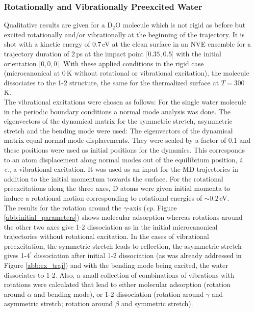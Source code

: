 \documentclass[11pt,DIV=13,BCOR=5mm,a4paper,headinclude]{scrbook}
\begin{document}
\subsubsection{Rotationally and Vibrationally Preexcited Water}\label{preex}
Qualitative results are given for a D$_2$O molecule which is not rigid as before but excited rotationally and/or vibrationally at the beginning of the trajectory.
It is shot with a kinetic energy of $0.7\,$eV at the clean surface in an NVE ensemble for a trajectory duration of $2\,$ps at the impact point [$0.35,0.5$] with the initial orientation [$0,0,0$].
With these applied conditions in the rigid case (microcanonical at $0\,$K without rotational or vibrational excitation), the molecule dissociates to the 1-2 structure, the same for the thermalized surface at $T=300\,$K.
\\
The vibrational excitations were chosen as follows: For the single water molecule in the periodic boundary conditions a normal mode analysis	 was done.
The eigenvectors of the dynamical matrix for the symmetric stretch, asymmetric stretch and the bending mode were used: The eigenvectors of the dynamical matrix equal normal mode displacements.
They were scaled by a factor of 0.1 and these positions were used as initial positions
for the dynamics.
This corresponds to an atom displacement along normal modes out of the equilibrium position, \textit{i.
e.}, a vibrational excitation.
It was used as an input for the MD trajectories in addition to the initial momentum towards the surface.
For the rotational preexcitations along the three axes, D atoms were given initial momenta to induce a rotational motion corresponding to rotational energies of $\sim 0.2\,$eV.
\\
The results for the rotation around the $\gamma$-axis (\textit{cp.} Figure \ref{abb:initial_parameters}) shows molecular adsorption whereas rotations around the other two axes give 1-2 dissociation as in the initial microcanonical trajectories without rotational excitation.
In the cases of vibrational preexcitation, the symmetric stretch leads to reflection, the asymmetric stretch gives 1-4$^\prime$ dissociation after initial 1-2 dissociation (as was already addressed in Figure \ref{abb:ex_traj}) and with the bending mode being excited, the water dissociates to 1-2.
Also, a small collection of combinations of vibrations with rotations were calculated that lead to either molecular adsorption (rotation around $\alpha$ and bending mode), or 1-2 dissociation (rotation around $\gamma$ and asymmetric stretch; rotation around $\beta$ and symmetric stretch).
\end{document}
